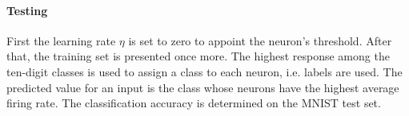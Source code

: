 \vspace{-3mm}
\paragraph{\textbf{Testing}}
First the learning rate $\eta$ is set to zero to appoint the neuron's threshold.
After that, the training set is presented once more.
The highest response among the ten-digit classes is used to assign a class to each neuron, i.e. labels are used.
The predicted value for an input is the class whose neurons have the highest average firing rate.
The classification accuracy is determined on the MNIST test set.